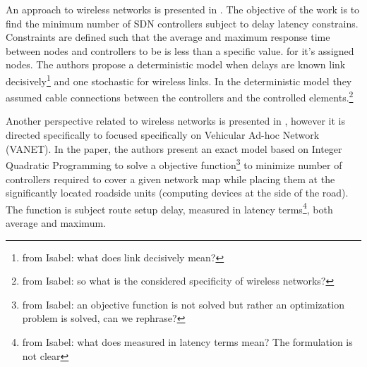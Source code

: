 \documentclass{IEEEtran}
\newcommand\fia[1]{{\color{red}\footnote{\color{red}from Isabel: #1}}} %
\newcommand\mia[1]{{\color{red}#1}}%
\newcommand\delia[1]{{\tiny{\color{red}#1}}} %
\begin{document}
An approach to wireless networks is presented in \cite{AbMa17}. The objective of the work is to find the minimum number of \delia{SDN} controllers subject to \delia{delay} \mia{latency} constrains. \mia{Constraints are defined such that} the average and maximum response time between nodes and controllers \delia{to be} \mia{is} less than a specific value. \delia{ for it's assigned nodes.} The authors propose a deterministic model when delays are known link decisively\fia{what does link decisively mean?} and one stochastic for wireless links.
In the deterministic model they assumed cable connections between the controllers and the controlled elements.\fia{so what is the considered specificity of wireless networks?}   %

Another perspective related to wireless networks is presented in \cite{SuMa18}, however it is \delia{directed specifically to} \mia{focused specifically on} Vehicular Ad-hoc Network (VANET). In the paper, the authors present an exact model based on Integer Quadratic Programming to solve a objective function\fia{an objective function is not solved but rather an optimization problem is solved, can we rephrase?} to minimize number of controllers required to cover a given network map while placing them at the significantly located roadside units (computing devices at the side of the road). The function is subject route setup delay, measured in latency terms\fia{what does measured in latency terms mean? The formulation is not clear}, both average and maximum. %
\end{document}
